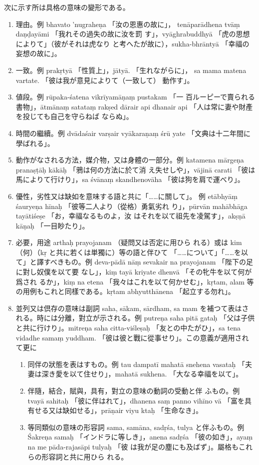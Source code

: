 \numberParagraph \label{np:226}
次に示す所は具格の意味の變形である。
\begin{enumerate}[label=(\arabic*)]
\item \label{item:2261} 理由。例 bhavato 'nugraheṇa 「汝の恩惠の故に」，
tenāparādhena tvāṃ daṇḍayāmi 「我れその過失の故に汝を罰
す」，vyāghrabuddhyā 「虎の思想によりて」（彼がそれは虎なり
と考へたが故に），sukha-bhrāntyā 「幸福の妄想の故に」。
\item 一致。例 prakṛtyā 「性質上」，jātyā. 「生れながらに」，
sa mama matena vartate. 「彼は我が意見によりて（一致して）
動作す」。
\item 値段。例 rūpaka-śatena vikrīyamāṇaṃ pustakam 「一
百ルーピーで賣られる書物」，ātmānaṃ satataṃ rakṣed dārair
api dhanair api 「人は常に妻や財產を投じても自己を守らねば
ならぬ」。
\item 時間の繼續。例 dvādaśair varṣair vyākaraṇaṃ śrū\-%
yate 「文典は十二年間に學ばれる」。
\item 動作がなされる方法，媒介物，又は身體の一部分。例
katamena mārgeṇa pranaṣṭāḥ kākāḥ 「鴉は何の方法に於て消
え失せしや」，vājinā carati 「彼は馬によりて行けり」，sa
śvānaṃ skandhenovāha 「彼は狗を肩で運べり」。
\item 優性，劣性又は缺如を意味する語と共に「……に關して」。
例 etābhyāṃ śauryeṇa hīnaḥ 「彼等二人より（從格）勇氣劣れ
り」，pūrvān mahābhāga tayātiśeṣe 「お，幸福なるものよ，汝
はそれを以て祖先を凌駕す」，akṣṇā kāṇaḥ 「一目眇たり」。
\item 必要，用途 arthaḥ prayojanam （疑問又は否定に用ひら
れる）或は kim （何）（kṛ と共に若くは単獨に）等の語と伴ひて
「……について」「……を以て」と譯すべきもの。例 deva-pādā\-%
nāṃ sevakair na prayojanam 「陛下の足に對し奴僕を以て要
なし」，kiṃ tayā kriyate dhenvā 「その牝牛を以て何が爲され
るか」，kiṃ na etena 「我々はこれを以て何かせむ」，kṛtam,
alam 等の用例もこれと同樣である。kṛtam abhyutthānena
「起立する勿れ」。
\item \label{item:2268} 並列又は倶存の意味は副詞 saha, sākam, sārdham, sa\-%
mam を補つて表はされる。時には分離，對立が示される。例
putreṇa saha pitā gataḥ 「父は子供と共に行けり」。mitreṇa
saha citta-viśleṣaḥ 「友との中たがひ」，sa tena vidadhe samaṃ
yuddham. 「彼は彼と戰に從事せり」。この意義が適用されて更に
\begin{enumerate}[label=(\alph*)]
\item 同伴の狀態を表はすもの。例 tau dampatī mahatā
snehena vasataḥ 「夫妻は深き愛を以て住せり」，mahatā
sukhena. 「大なる幸福を以て」。
\item \label{item:2268b} 伴隨，結合，賦與，具有，對立の意味の動詞の受動と伴
ふもの。例 tvayā sahitaḥ 「彼に伴はれて」，dhanena saṃ\-%
panno vihīno vā 「富を具有せる又は缺如せる」，prāṇair viyu\-%
ktaḥ 「生命なき」。
\item 等同類似の意味の形容詞 sama, samāna, sadṛśa, tulya
と伴ふもの。例 Śakreṇa samaḥ 「インドラに等しき」，anena
sadṛśa 「彼の如き」，ayaṃ na me pāda-rajasāpi tulyaḥ 「彼
は我が足の塵にも及ばず」。屬格もこれらの形容詞と共に用ひら
れる。
\end{enumerate}
\end{enumerate}

